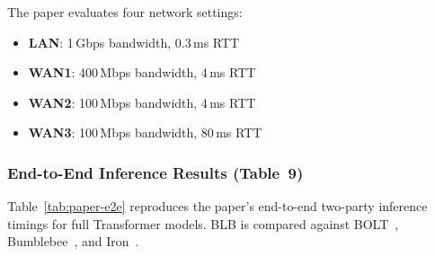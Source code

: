 The paper evaluates four network settings:
\begin{itemize}[nosep]
  \item \textbf{LAN}: 1\,Gbps bandwidth, 0.3\,ms RTT
  \item \textbf{WAN1}: 400\,Mbps bandwidth, 4\,ms RTT
  \item \textbf{WAN2}: 100\,Mbps bandwidth, 4\,ms RTT
  \item \textbf{WAN3}: 100\,Mbps bandwidth, 80\,ms RTT
\end{itemize}

\subsubsection{End-to-End Inference Results (Table~9)}

Table~\ref{tab:paper-e2e} reproduces the paper's end-to-end two-party inference timings for full Transformer models.
BLB is compared against BOLT~\cite{pang2024bolt}, Bumblebee~\cite{lu2023bumblebee}, and Iron~\cite{iron2022}.

\begin{table}[ht]
\centering
\caption{Published end-to-end 2PC inference times (from BLB Table~9). All times in minutes; communication in GB. ``/'' indicates data not reported.}
\label{tab:paper-e2e}
\end{table}

